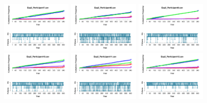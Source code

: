 \begin{figure}[th]
\includegraphics[width=0.30\textwidth]{Figures/Outcome_Exp2_P7} \includegraphics[width=0.30\textwidth]{Figures/Outcome_Exp2_P8} \includegraphics[width=0.30\textwidth]{Figures/Outcome_Exp2_P9}
\includegraphics[width=0.30\textwidth]{Figures/Outcome_Exp2_P10} \includegraphics[width=0.30\textwidth]{Figures/Outcome_Exp2_P11} \includegraphics[width=0.30\textwidth]{Figures/Outcome_Exp2_P12}

\end{figure}

